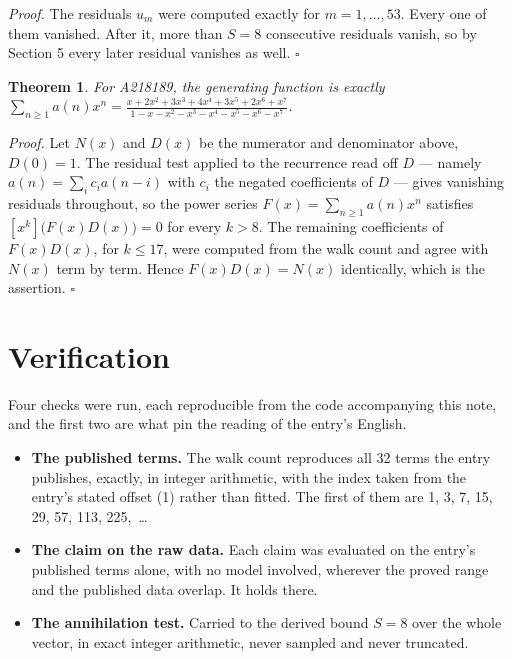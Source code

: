 \documentclass[11pt]{article}
\newtheorem{theorem}{Theorem}
\theoremstyle{definition}
\begin{document}
{\itshape Proof.} The residuals $u_m$ were computed exactly for $m = 1,\dots,53$. Every one of them vanished. After it, more than $S = 8$ consecutive residuals vanish, so by Section 5 every later residual vanishes as well. $\square$

\begin{theorem} For A218189, the generating function is exactly $\sum_{n\ge 1} a(n)x^n = \frac{x + 2x^{2} + 3x^{3} + 4x^{4} + 3x^{5} + 2x^{6} + x^{7}}{1 - x - x^{2} - x^{3} - x^{4} - x^{5} - x^{6} - x^{7}}$.\end{theorem}

{\itshape Proof.} Let $N(x)$ and $D(x)$ be the numerator and denominator above, $D(0)=1$. The residual test applied to the recurrence read off $D$ --- namely $a(n) = \sum_i c_i a(n-i)$ with $c_i$ the negated coefficients of $D$ --- gives vanishing residuals throughout, so the power series $F(x)=\sum_{n\ge 1}a(n)x^n$ satisfies $[x^k]\bigl(F(x)D(x)\bigr) = 0$ for every $k > 8$. The remaining coefficients of $F(x)D(x)$, for $k \le 17$, were computed from the walk count and agree with $N(x)$ term by term. Hence $F(x)D(x) = N(x)$ identically, which is the assertion. $\square$

\section{Verification}

Four checks were run, each reproducible from the code accompanying this note, and the first two are what pin the reading of the entry's English.

\begin{itemize}

\item {\bfseries The published terms.} The walk count reproduces all 32 terms the entry publishes, exactly, in integer arithmetic, with the index taken from the entry's stated offset (1) rather than fitted. The first of them are 1, 3, 7, 15, 29, 57, 113, 225,~\dots

\item {\bfseries The claim on the raw data.} Each claim was evaluated on the entry's published terms alone, with no model involved, wherever the proved range and the published data overlap. It holds there.

\item {\bfseries The annihilation test.} Carried to the derived bound $S = 8$ over the whole vector, in exact integer arithmetic, never sampled and never truncated.

\end{itemize}
\end{document}
